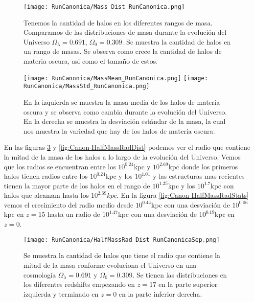 \begin{figure}[H]
    \centering
    \texttt{[image: RunCanonica/Mass\_Dist\_RunCanonica.png]}
    \caption[Comparación de distribución de masa en un Universo $\Omega_\lambda = 0.691 $, $\Omega_0 = 0.309$]{\footnotesize Tenemos la cantidad de halos en los diferentes rangos de masa. Comparamos de las distribuciones de masa durante la evolución del Universo $\Omega_\lambda = 0.691 $, $\Omega_0 = 0.309$. Se muestra la cantidad de halos en un rango de masas. Se observa como crece la cantidad de halos de materia oscura, asi como el tamaño de estos.}
    \label{fig:Canon-MassDist}
\end{figure}

\begin{figure}[H]
    \centering
    \texttt{[image: RunCanonica/MassMean\_RunCanonica.png]}
    \texttt{[image: RunCanonica/MassStd\_RunCanonica.png]}
    \caption[Media y desviación estándar de la distribución de masa de un Universo $\Omega_\lambda = 0.691 $, $\Omega_0 = 0.309$]{\footnotesize En la izquierda se muestra la masa media de los halos de materia oscura y se observa como cambia durante la evolución del Universo. En la derecha se muestra la desviación estándar de la masa, la cual nos muestra la variedad que hay de los halos de materia oscura.}
    \label{fig:Canon-MassStats}
\end{figure}

En las figuras \ref{fig:Canon-HalfMassRadDistSep} y \ref{fig:Canon-HalfMassRadDist} podemos ver el radio que contiene la mitad de la masa de los halos a lo largo de la evolución del Universo. Vemos que los radios se encuentran entre los $10^{0.24}$kpc y $10^{2.69}$kpc donde los primeros halos tienen radios entre los $10^{0.24}$kpc y los $10^{1.01}$ y las estructuras mas recientes tienen la mayor parte de los halos en el rango de $10^{1.25}$kpc y los $10^{1.7}$kpc con halos que alcanzan hasta los $10^{2.69}kpc$. En la figura \ref{fig:Canon-HalfMassRadStats} vemos el crecimiento del radio medio desde $10^{0.44}$kpc con una desviación de $10^{0.06}$kpc en $z=15$ hasta un radio de $10^{1.47}$kpc con una desviación de $10^{0.19}$kpc en $z=0$.

\begin{figure}[H]
    \centering
    \texttt{[image: RunCanonica/HalfMassRad\_Dist\_RunCanonicaSep.png]}
    \caption[Radio que contiene la mitad de la masa en la evolución de un Universo $\Omega_\lambda = 0.691 $, $\Omega_0 = 0.309$]{\footnotesize Se muestra la cantidad de halos que tiene el radio que contiene la mitad de la masa conforme evoluciona el Universo en una cosmología $\Omega_\lambda = 0.691 $ y $\Omega_0 = 0.309$. Se tienen las distribuciones en los diferentes redshifts empezando en $z=17$ en la parte superior izquierda y terminado en $z=0$ en la parte inferior derecha.}
    \label{fig:Canon-HalfMassRadDistSep}
\end{figure}

